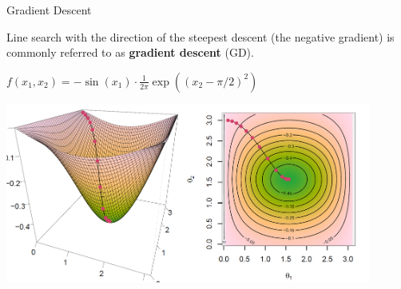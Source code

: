 \begin{vbframe}{Gradient Descent}

	Line search with the direction of the steepest descent (the negative gradient) is commonly referred to as \textbf{gradient descent} (GD). 

	\begin{center}
		$f(x_1, x_2) = - \sin(x_1) \cdot \frac{1}{2\pi} \exp\left( (x_2 - \pi / 2)^2 \right)$

		\begin{center}
			\includegraphics[width = 0.9\textwidth]{figure_man/example-descent1.png}
		\end{center}
		
	\end{center}

\end{vbframe}




